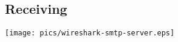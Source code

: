 \documentclass[xga]{xdvislides}
\begin{document}
\subsection{Receiving}
\begin{center}
	\texttt{[image: pics/wireshark-smtp-server.eps]}
\end{center}

%
%
%
%
%
\end{document}
